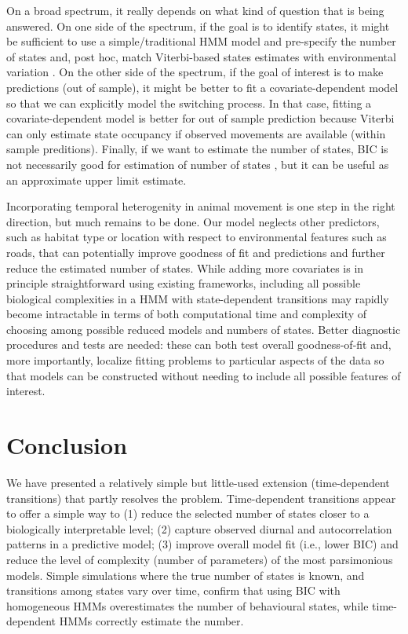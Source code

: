 \documentclass{bmcart}
\begin{document}
On a broad spectrum, it really depends on what kind of question 
that is being answered. On one side of the spectrum, if the goal is 
to identify states, it might be sufficient to use a 
simple/traditional HMM model and pre-specify the number of states and, post hoc, 
match Viterbi-based states estimates with environmental variation 
\cite{fryxell_multiple_2008}. On the other side of the 
spectrum, if the goal of interest is to make predictions (out of sample), 
it might be better to fit a covariate-dependent model so that we can explicitly
model the switching process. In that case, fitting a covariate-dependent model is
better for out of sample prediction because Viterbi can only estimate state 
occupancy if observed movements are available (within sample preditions). 
Finally, if we want to estimate the number of states, BIC is not necessarily 
good for estimation of number of states \cite{biernacki2000assessing}, 
but it can be useful as an approximate upper limit estimate. 

Incorporating temporal heterogenity in animal movement is one step in
the right direction, but much remains to be done. 
Our model neglects other predictors, such as habitat type or
location with respect to environmental features such as roads,
that can potentially improve goodness of fit and predictions and 
further reduce the estimated number of states. While adding
more covariates is in principle straightforward using existing
frameworks, including all possible biological complexities in 
a HMM with state-dependent transitions may rapidly become intractable
in terms of both computational time and complexity of choosing
among possible reduced models and numbers of states.
Better diagnostic procedures and tests are needed:
these can both test overall goodness-of-fit \cite{potts_generalized_2014} 
and, more importantly, localize fitting problems to particular aspects of the
data so that models can be constructed without needing to
include all possible features of interest.

\section*{Conclusion}

We have presented a relatively simple but little-used extension
(time-dependent transitions) that partly resolves the problem.
Time-dependent transitions appear to offer a simple way to (1) reduce
the selected number of states closer to a biologically interpretable
level; (2) capture observed diurnal and autocorrelation patterns in a
predictive model; (3) improve overall model fit (i.e., lower BIC) and
reduce the level of complexity (number of parameters) of the most
parsimonious models. Simple simulations where the true number of
states is known, and transitions among states vary over time, confirm
that using BIC with homogeneous HMMs overestimates the number of
behavioural states, while time-dependent HMMs correctly estimate
the number.
\end{document}

